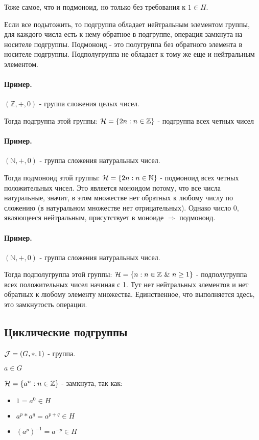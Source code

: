 \documentclass{report}
\newcommand{\band}{\mbox{ } \& \mbox{ }}
\begin{document}
Тоже самое, что и подмоноид, но только без требования к $1 \in H$.

\medskip

Если все подытожить, то подгруппа обладает нейтральным элементом группы,
для каждого числа есть к нему обратное в подгруппе, операция замкнута на носителе
подгруппы. Подмоноид - это полугруппа без обратного элемента в носителе подгруппы.
Подполугруппа не обладает к тому же еще и нейтральным элементом.

\paragraph*{Пример.}
$(\mathbb{Z}, +, 0)$ - группа сложения целых чисел.

Тогда подгруппа этой группы: ${\cal H} = \{2n:n \in \mathbb{Z}\}$ - подгруппа всех четных чисел

\paragraph*{Пример.}
$(\mathbb{N}, +, 0)$ - группа сложения натуральных чисел.

Тогда подмоноид этой группы: ${\cal H} = \{2n:n \in \mathbb{N}\}$ - подмоноид всех четных положительных чисел.
Это является моноидом потому, что все числа натуральные, значит, в этом множестве
нет обратных к любому числу по сложению (в натуральном множестве нет отрицательных). Однако
число 0, являющееся нейтральным, присутствует в моноиде $\Rightarrow$ подмоноид.

\paragraph*{Пример.}
$(\mathbb{N}, +, 0)$ - группа сложения натуральных чисел.

Тогда подполугруппа этой группы: ${\cal H} = \{n:n \in \mathbb{Z} \band n \geq 1\}$ - подполугруппа всех
положительных чисел начиная с 1. Тут нет нейтральных элементов и нет обратных к любому элементу множества.
Единственное, что выполняется здесь, это замкнутость операции.

\subsection{Циклические подгруппы}
${\cal J} = (G, *, 1)$ - группа.

$a \in G$

${\cal H} = \{a^{n}: n \in \mathbb{Z}\}$ - замкнута, так как:
\begin{itemize}
	\item $1 = a^{0} \in H$
	\item $a^p * a^q = a^{p+q} \in H$
	\item $(a^p)^{-1} = a^{-p} \in H$
\end{itemize}
\end{document}
